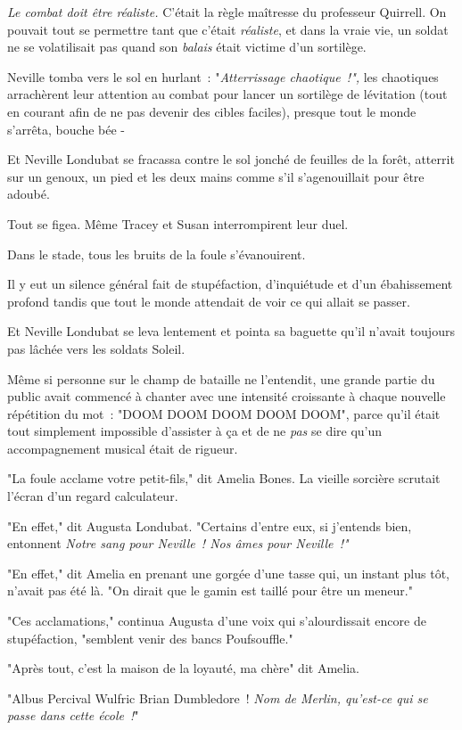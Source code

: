 \emph{Le combat doit être réaliste.} C'était la règle maîtresse du professeur Quirrell. On pouvait tout se permettre tant que c'était \emph{réaliste}, et dans la vraie vie, un soldat ne se volatilisait pas quand son \emph{balais} était victime d'un sortilège.

Neville tomba vers le sol en hurlant~: "\emph{Atterrissage chaotique~!",} les chaotiques arrachèrent leur attention au combat pour lancer un sortilège de lévitation (tout en courant afin de ne pas devenir des cibles faciles), presque tout le monde s'arrêta, bouche bée -

Et Neville Londubat se fracassa contre le sol jonché de feuilles de la forêt, atterrit sur un genoux, un pied et les deux mains comme s'il s'agenouillait pour être adoubé.

Tout se figea. Même Tracey et Susan interrompirent leur duel.

Dans le stade, tous les bruits de la foule s'évanouirent.

Il y eut un silence général fait de stupéfaction, d'inquiétude et d'un ébahissement profond tandis que tout le monde attendait de voir ce qui allait se passer.

Et Neville Londubat se leva lentement et pointa sa baguette qu'il n'avait toujours pas lâchée vers les soldats Soleil.

Même si personne sur le champ de bataille ne l'entendit, une grande partie du public avait commencé à chanter avec une intensité croissante à chaque nouvelle répétition du mot~: "DOOM DOOM DOOM DOOM DOOM", parce qu'il était tout simplement impossible d'assister à ça et de ne \emph{pas} se dire qu'un accompagnement musical était de rigueur.

"La foule acclame votre petit-fils," dit Amelia Bones. La vieille sorcière scrutait l'écran d'un regard calculateur.

"En effet," dit Augusta Londubat. "Certains d'entre eux, si j'entends bien, entonnent \emph{Notre sang pour Neville~! Nos âmes pour Neville~!"}

"En effet," dit Amelia en prenant une gorgée d'une tasse qui, un instant plus tôt, n'avait pas été là. "On dirait que le gamin est taillé pour être un meneur."

"Ces acclamations," continua Augusta d'une voix qui s'alourdissait encore de stupéfaction, "semblent venir des bancs Poufsouffle."

"Après tout, c'est la maison de la loyauté, ma chère" dit Amelia.

"Albus Percival Wulfric Brian Dumbledore~! \emph{Nom de Merlin, qu'est-ce qui se passe dans cette école~!}"


